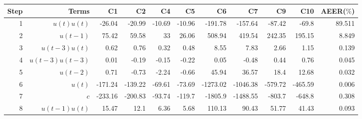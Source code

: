 \begin{tabular}{rrrrrrrrrrr}
Step & Terms & C1 & C2 & C4 & C5 & C6 & C7 & C9 & C10 & AEER($\%$) \\ 
\hline 
1 & $u(t)u(t)$ & -26.04 & -20.99 & -10.69 & -10.96 & -191.78 & -157.64 & -87.42 & -69.8 & 89.511 \\ 
2 & $u(t-1)$ & 75.42 & 59.58 & 33 & 26.06 & 508.94 & 419.54 & 242.35 & 195.15 & 8.849 \\ 
3 & $u(t-3)u(t)$ & 0.62 & 0.76 & 0.32 & 0.48 & 8.55 & 7.83 & 2.66 & 1.15 & 0.139 \\ 
4 & $u(t-3)u(t-3)$ & 0.01 & -0.19 & -0.15 & -0.22 & 0.05 & -0.48 & 0.44 & 0.76 & 0.045 \\ 
5 & $u(t-2)$ & 0.71 & -0.73 & -2.24 & -0.66 & 45.94 & 36.57 & 18.4 & 12.68 & 0.032 \\ 
6 & $u(t)$ & -171.24 & -139.22 & -69.61 & -73.69 & -1273.02 & -1046.38 & -579.72 & -465.59 & 0.006 \\ 
7 & $c$ & -233.16 & -200.83 & -93.74 & -119.7 & -1805.9 & -1488.55 & -803.7 & -648.8 & 0.308 \\ 
8 & $u(t-1)u(t)$ & 15.47 & 12.1 & 6.36 & 5.68 & 110.13 & 90.43 & 51.77 & 41.43 & 0.093 \\ 
\hline 
\end{tabular}